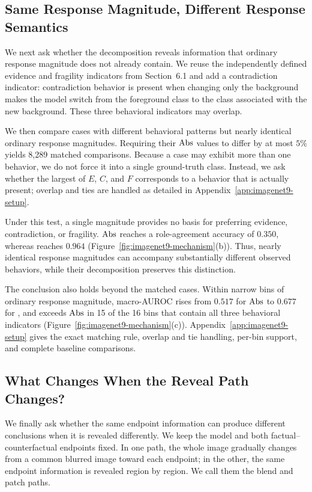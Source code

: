\subsection{Same Response Magnitude, Different Response Semantics}

We next ask whether the decomposition reveals information that ordinary
response magnitude does not already contain. We reuse the independently defined
evidence and fragility indicators from Section~6.1 and add a contradiction
indicator: contradiction behavior is present when changing only the background
makes the model switch from the foreground class to the class associated with
the new background. These three behavioral indicators may overlap.

We then compare cases with different behavioral patterns but nearly identical
ordinary response magnitudes. Requiring their $\mathrm{Abs}$ values to differ by at
most $5\%$ yields 8,289 matched comparisons. Because a case may exhibit more
than one behavior, we do not force it into a single ground-truth class.
Instead, we ask whether the largest of $E$, $C$, and $F$ corresponds to a
behavior that is actually present; overlap and ties are handled as detailed in
Appendix~\ref{app:imagenet9-setup}.

Under this test, a single magnitude provides no basis for preferring evidence,
contradiction, or fragility. $\mathrm{Abs}$ reaches a role-agreement accuracy of
$0.350$, whereas \decaf reaches $0.964$
(Figure~\ref{fig:imagenet9-mechanism}(b)). Thus, nearly identical response
magnitudes can accompany substantially different observed behaviors, while
their decomposition preserves this distinction.

The conclusion also holds beyond the matched cases. Within narrow bins of
ordinary response magnitude, macro-AUROC rises from $0.517$ for $\mathrm{Abs}$ to
$0.677$ for \decaf, and \decaf exceeds $\mathrm{Abs}$ in 15 of the 16 bins that
contain all three behavioral indicators
(Figure~\ref{fig:imagenet9-mechanism}(c)). Appendix~\ref{app:imagenet9-setup}
gives the exact matching rule, overlap and tie handling, per-bin support, and
complete baseline comparisons.

\subsection{What Changes When the Reveal Path Changes?}

We finally ask whether the same endpoint information can produce different
conclusions when it is revealed differently. We keep the model and both
factual--counterfactual endpoints fixed. In one path, the whole image gradually
changes from a common blurred image toward each endpoint; in the other, the
same endpoint information is revealed region by region. We call them the
blend and patch paths.

